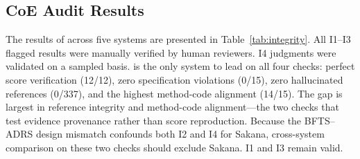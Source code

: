 
\subsection{CoE Audit Results}
\label{sec:exp:integrity}

\begin{table}[h]
\centering
\small
\caption{\coeaudit{} results across five systems (15~papers per system).
EPLB papers are excluded from Score Verif.\ because its scoring formula includes an execution-time component that varies with hardware, making scores non-reproducible across machines.
Metric definitions are in \S\ref{sec:coeaudit}.
}
\label{tab:integrity}
\end{table}

The results of \coeaudit{} across five systems are presented in Table~\ref{tab:integrity}.
All I1--I3 flagged results were manually verified by human reviewers. I4 judgments were validated on a sampled basis.
\sys{} is the only system to lead on all four checks: perfect score verification (12/12), zero specification violations (0/15), zero hallucinated references (0/337), and the highest method-code alignment (14/15).
The gap is largest in reference integrity and method-code alignment---the two checks that test evidence provenance rather than score reproduction.
Because the BFTS--ADRS design mismatch confounds both I2 and I4 for Sakana, cross-system comparison on these two checks should exclude Sakana. I1 and I3 remain valid.

